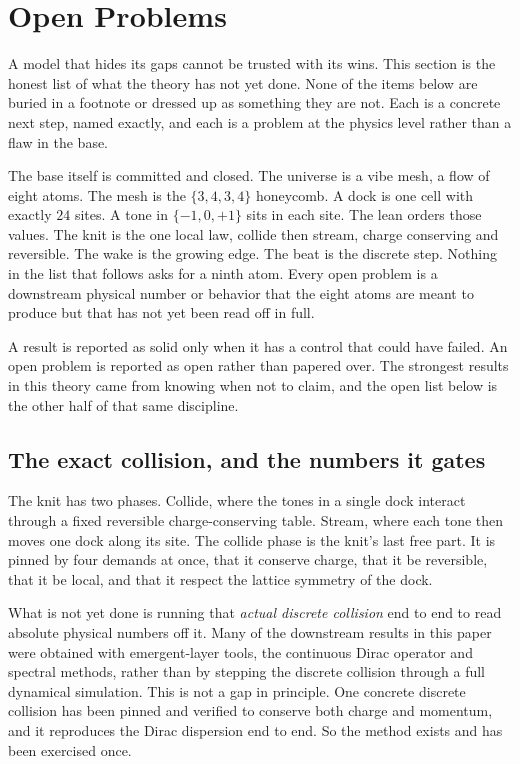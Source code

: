 \section{Open Problems}

A model that hides its gaps cannot be trusted with its wins. This section is the honest list of what the theory has not yet done. None of the items below are buried in a footnote or dressed up as something they are not. Each is a concrete next step, named exactly, and each is a problem at the physics level rather than a flaw in the base.

The base itself is committed and closed. The universe is a vibe mesh, a flow of eight atoms. The mesh is the $\{3,4,3,4\}$ honeycomb. A dock is one cell with exactly $24$ sites. A tone in $\{-1,0,+1\}$ sits in each site. The lean orders those values. The knit is the one local law, collide then stream, charge conserving and reversible. The wake is the growing edge. The beat is the discrete step. Nothing in the list that follows asks for a ninth atom. Every open problem is a downstream physical number or behavior that the eight atoms are meant to produce but that has not yet been read off in full.

\begin{principle}
A result is reported as solid only when it has a control that could have failed. An open problem is reported as open rather than papered over. The strongest results in this theory came from knowing when not to claim, and the open list below is the other half of that same discipline.
\end{principle}

\subsection{The exact collision, and the numbers it gates}

The knit has two phases. Collide, where the tones in a single dock interact through a fixed reversible charge-conserving table. Stream, where each tone then moves one dock along its site. The collide phase is the knit's last free part. It is pinned by four demands at once, that it conserve charge, that it be reversible, that it be local, and that it respect the lattice symmetry of the dock.

What is not yet done is running that \emph{actual discrete collision} end to end to read absolute physical numbers off it. Many of the downstream results in this paper were obtained with emergent-layer tools, the continuous Dirac operator and spectral methods, rather than by stepping the discrete collision through a full dynamical simulation. This is not a gap in principle. One concrete discrete collision has been pinned and verified to conserve both charge and momentum, and it reproduces the Dirac dispersion end to end. So the method exists and has been exercised once.

